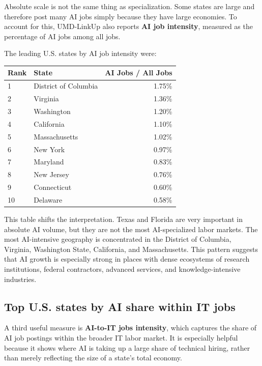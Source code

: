 \documentclass[12pt,a4paper]{article}
\begin{document}
Absolute scale is not the same thing as specialization. Some states are large and therefore post many AI jobs simply because they have large economies. To account for this, UMD-LinkUp also reports \textbf{AI job intensity}, measured as the percentage of AI jobs among all jobs.

The leading U.S. states by AI job intensity were:

\begin{center}
\begin{tabular}{llr}
\toprule
\textbf{Rank} & \textbf{State} & \textbf{AI Jobs / All Jobs} \\
\midrule
1 & District of Columbia & 1.75\% \\
2 & Virginia & 1.36\% \\
3 & Washington & 1.20\% \\
4 & California & 1.10\% \\
5 & Massachusetts & 1.02\% \\
6 & New York & 0.97\% \\
7 & Maryland & 0.83\% \\
8 & New Jersey & 0.76\% \\
9 & Connecticut & 0.60\% \\
10 & Delaware & 0.58\% \\
\bottomrule
\end{tabular}
\end{center}

This table shifts the interpretation. Texas and Florida are very important in absolute AI volume, but they are not the most AI-specialized labor markets. The most AI-intensive geography is concentrated in the District of Columbia, Virginia, Washington State, California, and Massachusetts. This pattern suggests that AI growth is especially strong in places with dense ecosystems of research institutions, federal contractors, advanced services, and knowledge-intensive industries.

\subsection{Top U.S. states by AI share within IT jobs}

A third useful measure is \textbf{AI-to-IT jobs intensity}, which captures the share of AI job postings within the broader IT labor market. It is especially helpful because it shows where AI is taking up a large share of technical hiring, rather than merely reflecting the size of a state's total economy.
\end{document}
